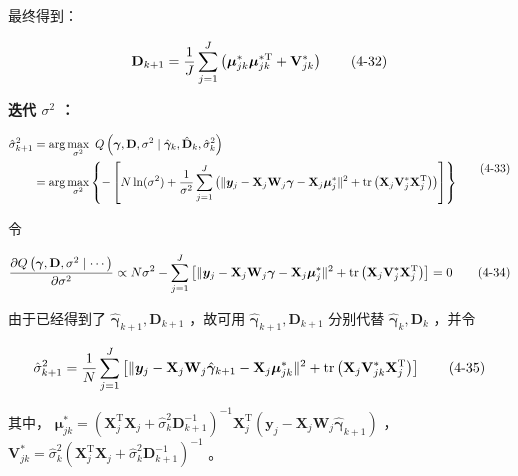 \documentclass[12pt,a4paper]{ctexart}
\makeatletter
\numberwithin{figure}{section}
\numberwithin{table}{section}
\let\ltx@orig@tag\tag
\renewcommand{\tag}[1]{\refstepcounter{equation}\ltx@orig@tag{#1}}%
\makeatother
\begin{document}
最终得到：

\begin{equation}
\mathbf{D}_{k+1}=\frac{1}{J}\sum_{j=1}^{J}\left(\boldsymbol{\mu}_{jk}^{*}\boldsymbol{\mu}_{jk}^{*\mathrm{T}}+\mathbf{V}_{jk}^{*}\right) \tag{4-32}
\end{equation}

\textbf{迭代 $\sigma^{2}$ ：}

\begin{equation}
\begin{aligned}
\hat{\sigma}_{k+1}^{2}&=\arg\max_{\sigma^{2}}\ Q\left(\boldsymbol{\gamma},\mathbf{D},\sigma^{2}\mid\hat{\boldsymbol{\gamma}}_{k},\hat{\mathbf{D}}_{k},\hat{\sigma}_{k}^{2}\right)\\
&=\arg\max_{\sigma^{2}}\left\{-\left[N\ln(\sigma^{2})+\frac{1}{\sigma^{2}}\sum_{j=1}^{J}\left(\|\boldsymbol{y}_{j}-\mathbf{X}_{j}\mathbf{W}_{j}\boldsymbol{\gamma}-\mathbf{X}_{j}\boldsymbol{\mu}_{j}^{*}\|^{2}+\operatorname{tr}\left(\mathbf{X}_{j}\mathbf{V}_{j}^{*}\mathbf{X}_{j}^{\mathrm{T}}\right)\right)\right]\right\}
\end{aligned} \tag{4-33}
\end{equation}

令

\begin{equation}
\frac{\partial Q\left(\boldsymbol{\gamma},\mathbf{D},\sigma^{2}\mid\cdots\right)}{\partial\sigma^{2}}\propto N\sigma^{2}-\sum_{j=1}^{J}\left[\|\boldsymbol{y}_{j}-\mathbf{X}_{j}\mathbf{W}_{j}\boldsymbol{\gamma}-\mathbf{X}_{j}\boldsymbol{\mu}_{j}^{*}\|^{2}+\operatorname{tr}\left(\mathbf{X}_{j}\mathbf{V}_{j}^{*}\mathbf{X}_{j}^{\mathrm{T}}\right)\right]=0 \tag{4-34}
\end{equation}

由于已经得到了 $\hat{\boldsymbol{\gamma}}_{k+1},\mathbf{D}_{k+1}$ ，故可用 $\hat{\boldsymbol{\gamma}}_{k+1},\mathbf{D}_{k+1}$ 分别代替 $\hat{\boldsymbol{\gamma}}_{k},\mathbf{D}_{k}$ ，并令

\begin{equation}
\hat{\sigma}_{k+1}^{2}=\frac{1}{N}\sum_{j=1}^{J}\left[\|\boldsymbol{y}_{j}-\mathbf{X}_{j}\mathbf{W}_{j}\hat{\boldsymbol{\gamma}}_{k+1}-\mathbf{X}_{j}\boldsymbol{\mu}_{jk}^{*}\|^{2}+\operatorname{tr}\left(\mathbf{X}_{j}\mathbf{V}_{jk}^{*}\mathbf{X}_{j}^{\mathrm{T}}\right)\right] \tag{4-35}
\end{equation}

其中， $\boldsymbol{\mu}_{jk}^{*}=\left(\mathbf{X}_{j}^{\mathrm{T}}\mathbf{X}_{j}+\hat{\sigma}_{k}^{2}\mathbf{D}_{k+1}^{-1}\right)^{-1}\mathbf{X}_{j}^{\mathrm{T}}\left(\boldsymbol{y}_{j}-\mathbf{X}_{j}\mathbf{W}_{j}\hat{\boldsymbol{\gamma}}_{k+1}\right)$ ， $\mathbf{V}_{jk}^{*}=\hat{\sigma}_{k}^{2}\left(\mathbf{X}_{j}^{\mathrm{T}}\mathbf{X}_{j}+\hat{\sigma}_{k}^{2}\mathbf{D}_{k+1}^{-1}\right)^{-1}$ 。
\end{document}
